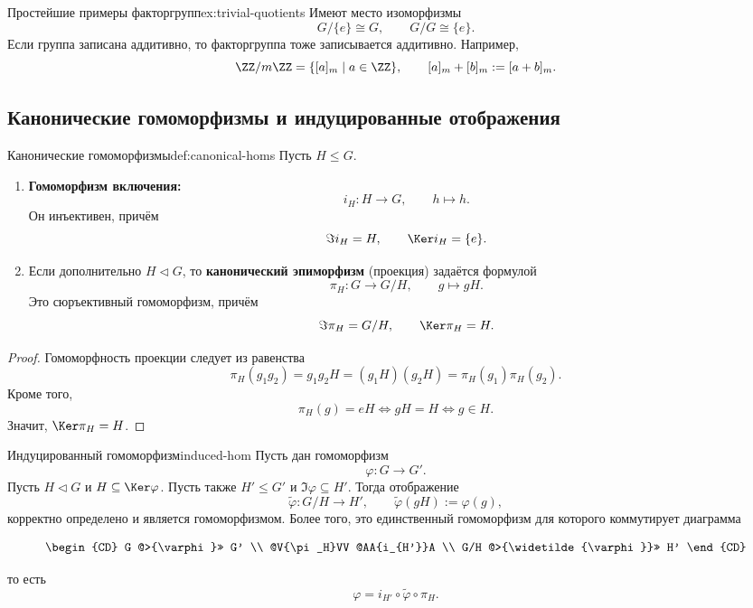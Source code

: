 \begin{Example}{Простейшие примеры факторгрупп}{ex:trivial-quotients}
	Имеют место изоморфизмы
	\[
	G/\{e\} \cong G, \qquad G/G \cong \{e\}.
	\]
	Если группа записана аддитивно, то факторгруппа тоже записывается аддитивно. Например,
	\[
	\ZZ/m\ZZ = \{[a]_m \mid a\in \ZZ\}, \qquad [a]_m + [b]_m := [a+b]_m.
	\]
\end{Example}

\subsection{Канонические гомоморфизмы и индуцированные отображения}

\begin{Definition}{Канонические гомоморфизмы}{def:canonical-homs}
	Пусть $H\le G$.
	\begin{enumerate}
		\item \textbf{Гомоморфизм включения:}
		\[
		i_H\colon H\to G, \qquad h\mapsto h.
		\]
		Он инъективен, причём
		\[
		\Im i_H = H, \qquad \Ker i_H = \{e\}.
		\]
		\item Если дополнительно $H\triangleleft G$, то \textbf{канонический эпиморфизм} (проекция) задаётся формулой
		\[
		\pi_H\colon G\to G/H, \qquad g\mapsto gH.
		\]
		Это сюръективный гомоморфизм, причём
		\[
		\Im \pi_H = G/H, \qquad \Ker \pi_H = H.
		\]
	\end{enumerate}
\end{Definition}

\begin{proof}
	Гомоморфность проекции следует из равенства
	\[
	\pi_H(g_1g_2)=g_1g_2H=(g_1H)(g_2H)=\pi_H(g_1)\pi_H(g_2).
	\]
	Кроме того,
	\[
	\pi_H(g)=eH \Longleftrightarrow gH=H \Longleftrightarrow g\in H.
	\]
	Значит, $\Ker \pi_H=H$.
\end{proof}

\begin{Theorem}{Индуцированный гомоморфизм}{induced-hom}
	Пусть дан гомоморфизм
	\[
	\varphi\colon G\to G'.
	\]
	Пусть $H\triangleleft G$ и $H\subseteq \Ker\varphi$. Пусть также $H'\le G'$ и
	$\Im\varphi\subseteq H'$. Тогда отображение
	\[
	\widetilde\varphi\colon G/H\to H', \qquad \widetilde\varphi(gH):=\varphi(g),
	\]
	корректно определено и является гомоморфизмом. Более того, это единственный гомоморфизм для которого коммутирует диаграмма

	\[
	\begin{CD}
		G @>{\varphi}>> G' \\
		@V{\pi_H}VV @AA{i_{H'}}A \\
		G/H @>{\widetilde{\varphi}}>> H'
	\end{CD}
	\]

	то есть
	\[
	\varphi = i_{H'}\circ \widetilde\varphi\circ \pi_H.
	\]
\end{Theorem}

